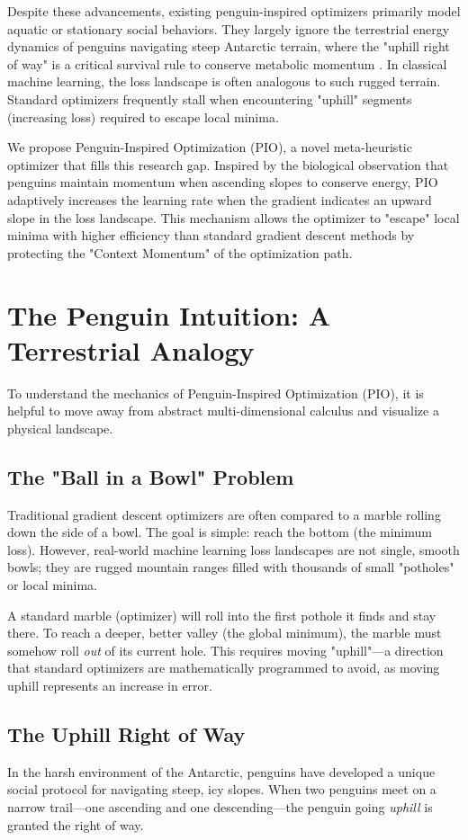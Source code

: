 \documentclass[conference]{IEEEtran}
\begin{document}
Despite these advancements, existing penguin-inspired optimizers primarily model aquatic or stationary social behaviors. They largely ignore the terrestrial energy dynamics of penguins navigating steep Antarctic terrain, where the "uphill right of way" is a critical survival rule to conserve metabolic momentum \cite{sharpe2026penguin}. In classical machine learning, the loss landscape is often analogous to such rugged terrain. Standard optimizers frequently stall when encountering "uphill" segments (increasing loss) required to escape local minima.

We propose Penguin-Inspired Optimization (PIO), a novel meta-heuristic optimizer that fills this research gap. Inspired by the biological observation that penguins maintain momentum when ascending slopes to conserve energy, PIO adaptively increases the learning rate when the gradient indicates an upward slope in the loss landscape. This mechanism allows the optimizer to "escape" local minima with higher efficiency than standard gradient descent methods by protecting the "Context Momentum" of the optimization path.

\section{The Penguin Intuition: A Terrestrial Analogy}
To understand the mechanics of Penguin-Inspired Optimization (PIO), it is helpful to move away from abstract multi-dimensional calculus and visualize a physical landscape.

\subsection{The "Ball in a Bowl" Problem}
Traditional gradient descent optimizers are often compared to a marble rolling down the side of a bowl. The goal is simple: reach the bottom (the minimum loss). However, real-world machine learning loss landscapes are not single, smooth bowls; they are rugged mountain ranges filled with thousands of small "potholes" or local minima.

A standard marble (optimizer) will roll into the first pothole it finds and stay there. To reach a deeper, better valley (the global minimum), the marble must somehow roll \textit{out} of its current hole. This requires moving "uphill"—a direction that standard optimizers are mathematically programmed to avoid, as moving uphill represents an increase in error.

\subsection{The Uphill Right of Way}
In the harsh environment of the Antarctic, penguins have developed a unique social protocol for navigating steep, icy slopes. When two penguins meet on a narrow trail—one ascending and one descending—the penguin going \textit{uphill} is granted the right of way.
\end{document}
